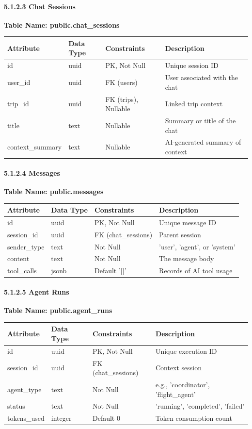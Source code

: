 \documentclass[11pt, a4paper]{article}
\newcommand{\datadictionarytable}[2]{
    \noindent\textbf{Table Name: #1}
    \begin{center}
    \begin{tabularx}{\linewidth}{|l|l|l|X|}
        \hline
        \textbf{Attribute} & \textbf{Data Type} & \textbf{Constraints} & \textbf{Description} \\
        \hline
        #2
    \end{tabularx}
    \end{center}
    \vspace{0.5cm}
}
\begin{document}
\paragraph{5.1.2.3 Chat Sessions}
\datadictionarytable{public.chat\_sessions}{
    id & uuid & PK, Not Null & Unique session ID \\ \hline
    user\_id & uuid & FK (users) & User associated with the chat \\ \hline
    trip\_id & uuid & FK (trips), Nullable & Linked trip context \\ \hline
    title & text & Nullable & Summary or title of the chat \\ \hline
    context\_summary & text & Nullable & AI-generated summary of context \\ \hline
}

\paragraph{5.1.2.4 Messages}
\datadictionarytable{public.messages}{
    id & uuid & PK, Not Null & Unique message ID \\ \hline
    session\_id & uuid & FK (chat\_sessions) & Parent session \\ \hline
    sender\_type & text & Not Null & 'user', 'agent', or 'system' \\ \hline
    content & text & Not Null & The message body \\ \hline
    tool\_calls & jsonb & Default '[]' & Records of AI tool usage \\ \hline
}

\paragraph{5.1.2.5 Agent Runs}
\datadictionarytable{public.agent\_runs}{
    id & uuid & PK, Not Null & Unique execution ID \\ \hline
    session\_id & uuid & FK (chat\_sessions) & Context session \\ \hline
    agent\_type & text & Not Null & e.g., 'coordinator', 'flight\_agent' \\ \hline
    status & text & Not Null & 'running', 'completed', 'failed' \\ \hline
    tokens\_used & integer & Default 0 & Token consumption count \\ \hline
}
\end{document}
